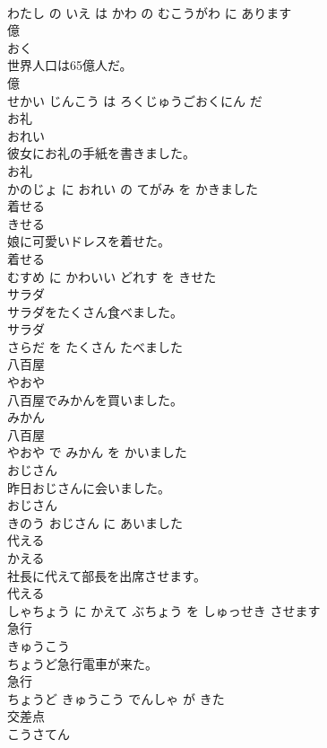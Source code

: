 \documentclass[8pt]{extreport}
\begin{document}
\begin{CJK}{UTF8}{min}
\\	わたし の いえ は かわ の むこうがわ に あります			
\\	億	
\\	おく			
\\	世界人口は65億人だ。	
\\	億 
\\	せかい じんこう は ろくじゅうごおくにん だ			
\\	お礼	
\\	おれい			
\\	彼女にお礼の手紙を書きました。	
\\	お礼 
\\	かのじょ に おれい の てがみ を かきました			
\\	着せる	
\\	きせる			
\\	娘に可愛いドレスを着せた。	
\\	着せる 
\\	むすめ に かわいい どれす を きせた			
\\	サラダ	
\\	サラダをたくさん食べました。	
\\	サラダ 
\\	さらだ を たくさん たべました			
\\	八百屋	
\\	やおや			
\\	八百屋でみかんを買いました。	
\\	みかん 
\\	八百屋 
\\	やおや で みかん を かいました			
\\	おじさん	
\\	昨日おじさんに会いました。	
\\	おじさん 
\\	きのう おじさん に あいました			
\\	代える	
\\	かえる			
\\	社長に代えて部長を出席させます。	
\\	代える 
\\	しゃちょう に かえて ぶちょう を しゅっせき させます			
\\	急行	
\\	きゅうこう			
\\	ちょうど急行電車が来た。	
\\	急行 
\\	ちょうど きゅうこう でんしゃ が きた			
\\	交差点	
\\	こうさてん			

\end{CJK}
\end{document}
